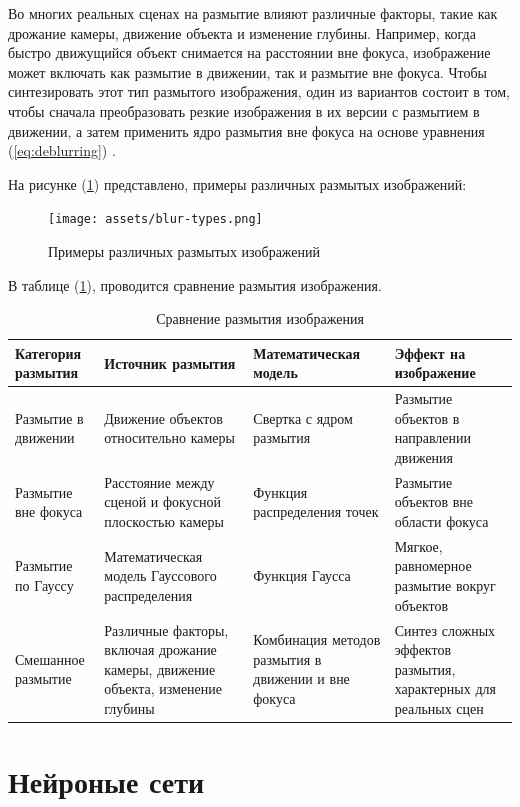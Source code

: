 Во многих реальных сценах на размытие влияют различные факторы, такие как дрожание камеры, движение объекта и изменение глубины. Например, когда быстро движущийся объект снимается на расстоянии вне фокуса, изображение может включать как размытие в движении, так и размытие вне фокуса. Чтобы синтезировать этот тип размытого изображения, один из вариантов состоит в том, чтобы сначала преобразовать резкие изображения в их версии с размытием в движении, а затем применить ядро размытия вне фокуса на основе уравнения (\ref{eq:deblurring}) \cite{zhang2020deblurring}.


На рисунке (\ref{fig:blur-types}) представлено, примеры различных размытых изображений: 
\begin{figure}[H]
	\centering
	\texttt{[image: assets/blur-types.png]}
	\caption{Примеры различных размытых изображений}
	\label{fig:blur-types}
\end{figure}

В таблице (\ref{tab:blur_comparison}), проводится сравнение размытия изображения.

\begin{table}[H]
    \centering
    \caption{Сравнение размытия изображения}
    \label{tab:blur_comparison}
    \begin{tabular}{|p{3cm}|p{4cm}|p{4cm}|p{4cm}|}
        \hline
        \textbf{Категория размытия} & \textbf{Источник размытия} & \textbf{Математическая модель} & \textbf{Эффект на изображение} \\ \hline
        Размытие в движении & Движение объектов относительно камеры & Свертка с ядром размытия & Размытие объектов в направлении движения \\ \hline
        Размытие вне фокуса & Расстояние между сценой и фокусной плоскостью камеры & Функция распределения точек & Размытие объектов вне области фокуса \\ \hline
        Размытие по Гауссу & Математическая модель Гауссового распределения & Функция Гаусса & Мягкое, равномерное размытие вокруг объектов \\ \hline
        Смешанное размытие & Различные факторы, включая дрожание камеры, движение объекта, изменение глубины & Комбинация методов размытия в движении и вне фокуса & Синтез сложных эффектов размытия, характерных для реальных сцен \\ \hline
    \end{tabular}
\end{table}

\section{Нейроные сети}

